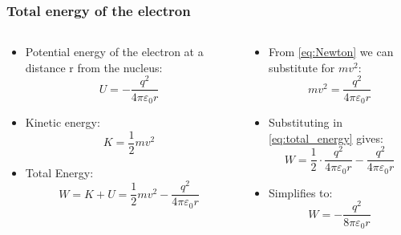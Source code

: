 \begin{frame}
	\frametitle{Total energy of the electron}
    \begin{columns}
        \begin{column}{0.5\textwidth}
            \begin{itemize}
                \item Potential energy of the electron at a distance r from the nucleus:
                \begin{equation}
                U = -\frac{q^2}{4 \pi \varepsilon_0 r}
                \end{equation}
                
                \item Kinetic energy:
                \begin{equation}
                K = \frac{1}{2}mv^2
                \end{equation}
                
                \item Total Energy:
                \begin{equation} \label{eq:total_energy}
                W = K + U = \frac{1}{2}mv^2 - \frac{q^2}{4 \pi \varepsilon_0 r}
                \end{equation}
                
            \end{itemize}
        \end{column}
        
        \hfill
        
        \begin{column}{0.5\textwidth}
            \centering
            \begin{itemize}
                \item From \ref{eq:Newton} we can substitute for $mv^2$:
                \begin{equation}
                mv^2 = \frac{q^2}{4 \pi \varepsilon_0 r}
                \end{equation}

                \item Substituting in \ref{eq:total_energy} gives:
                \begin{equation}
                W = \frac{1}{2} \cdot \frac{q^2}{4 \pi \varepsilon_0 r} - \frac{q^2}{4 \pi \varepsilon_0 r}
                \end{equation}
                
                \item Simplifies to:
                \begin{equation}
                W = -\frac{q^2}{8 \pi \varepsilon_0 r}
                \end{equation}
            \end{itemize}
        \end{column}
    \end{columns}
\end{frame}


